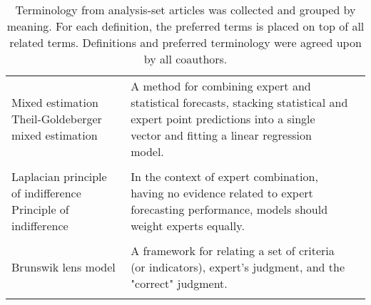 \documentclass[preprint,authoryear]{elsarticle}
\begin{document}
\begin{longtable}{L{6cm} L{5cm} L{3cm}}
        Mixed estimation  \hspace{35mm}
        Theil-Goldeberger mixed estimation &  A method for combining expert and statistical forecasts, stacking statistical and expert point predictions into a single vector and fitting a linear regression model. & 
        \citep{alho1992estimating,shin2013robust}\\
        \vspace{0.0625mm}\\
        
        Laplacian principle of indifference \hspace{12mm}
        Principle of indifference & In the context of expert combination, having no evidence related to expert forecasting performance, models should weight experts equally. & 
        \citep{ISI:000391078100005}\\
        \vspace{0.0625mm}\\
        
        Brunswik lens model & 
        A framework for relating a set of criteria (or indicators), expert's judgment, and the "correct" judgment. & 
        \citep{seifert2013relative,franses2011averaging}\\
         \hline
             \caption{Terminology from analysis-set articles was collected and grouped by meaning.
              For each definition, the preferred terms is placed on top of all related terms.
              Definitions and preferred terminology were agreed upon by all coauthors.\label{tbl.terms} }\\
 
       \end{longtable}
      
\end{document}
